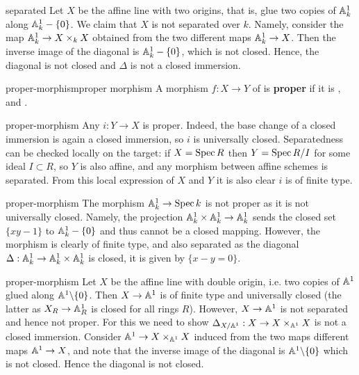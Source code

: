\begin{example}{separated}
    Let $X$ be the affine line with two origins, that is, glue two copies of $\AA_k^1$ along $\AA_k^1 - \{ 0 \}$. We claim that $X$ is not separated over $k$. Namely, consider the map $\AA^1_k \to X \times_k X$ obtained from the two different maps $\AA_k^1 \to X$. Then the inverse image of the diagonal is $\AA_k^1 - \{ 0 \}$, which is not closed. Hence, the diagonal is not closed and $\Delta$ is not a closed immersion.
\end{example}

\begin{topic}{proper-morphism}{proper morphism}
    A morphism $f : X \to Y$ of  is \textbf{proper} if it is ,  and .
\end{topic}

\begin{example}{proper-morphism}
    Any  $i : Y \to X$ is proper. Indeed, the base change of a closed immersion is again a closed immersion, so $i$ is universally closed. Separatedness can be checked locally on the target: if $X = \Spec R$ then $Y = \Spec R / I$ for some ideal $I \subset R$, so $Y$ is also affine, and any morphism between affine schemes is separated. From this local expression of $X$ and $Y$ it is also clear $i$ is of finite type.
\end{example}

\begin{example}{proper-morphism}
    The morphism $\AA_k^1 \to \Spec k$ is not proper as it is not universally closed. Namely, the projection $\AA^1_k \times \AA^1_k \to \AA^1_k$ sends the closed set $\{ xy - 1 \}$ to $\AA^1_k - \{ 0 \}$ and thus cannot be a closed mapping. However, the morphism is clearly of finite type, and also separated as the diagonal $\Delta : \AA^1_k \to \AA^1_k \times \AA^1_k$ is closed, it is given by $\{ x - y = 0 \}$.
\end{example}

\begin{example}{proper-morphism}
    Let $X$ be the affine line with double origin, i.e. two copies of $\AA^1$ glued along $\AA^1 \backslash \{ 0 \}$. Then $X \to \AA^1$ is of finite type and universally closed (the latter as $X_R \to \AA^1_R$ is closed for all rings $R$). However, $X \to \AA^1$ is not separated and hence not proper. For this we need to show $\Delta_{X / \AA^1} : X \to X \times_{\AA^1} X$ is not a closed immersion. Consider $\AA^1 \to X \times_{\AA^1} X$ induced from the two maps different maps $\AA^1 \to X$, and note that the inverse image of the diagonal is $\AA^1 \backslash \{ 0 \}$ which is not closed. Hence the diagonal is not closed.
\end{example}

